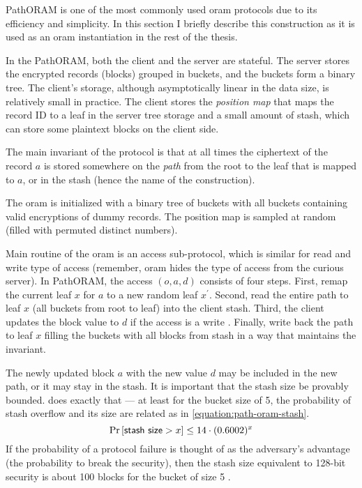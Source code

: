 			PathORAM \cite{path-oram} is one of the most commonly used \acrshort{oram} protocols due to its efficiency and simplicity.
			In this section I briefly describe this construction as it is used as an \acrshort{oram} instantiation in the rest of the thesis.

			In the PathORAM, both the client \client{} and the server \server{} are stateful.
			The server stores the encrypted records (blocks) grouped in buckets, and the buckets form a binary tree.
			The client's storage, although asymptotically linear in the data size, is relatively small in practice.
			The client stores the \emph{position map} that maps the record ID to a leaf in the server tree storage and a small amount of stash, which can store some plaintext blocks on the client side.

			The main invariant of the protocol is that at all times the ciphertext of the record $a$ is stored somewhere on the \emph{path} from the root to the leaf that is mapped to $a$, or in the stash (hence the name of the construction).

			The \acrshort{oram} is initialized with a binary tree of buckets with all buckets containing valid encryptions of dummy records.
			The position map is sampled at random (filled with permuted distinct numbers).

			Main routine of the \acrshort{oram} is an access sub-protocol, which is similar for read \oramRead{} and write \oramWrite{} type of access (remember, \acrshort{oram} hides the type of access from the curious server).
			In PathORAM, the access $(o, a, d)$ consists of four steps.
			First, remap the current leaf $x$ for $a$ to a new random leaf $x^\prime$.
			Second, read the entire path to leaf $x$ (all buckets from root to leaf) into the client stash.
			Third, the client updates the block value to $d$ if the access is a write \oramWrite{}.
			Finally, write back the path to leaf $x$ filling the buckets with all blocks from stash in a way that maintains the invariant.

			The newly updated block $a$ with the new value $d$ may be included in the new path, or it may stay in the stash.
			It is important that the stash size be provably bounded.
			\cite[Theorem 1]{path-oram} does exactly that --- at least for the bucket size of 5, the probability of stash overflow and its size are related as in \cref{equation:path-oram-stash}.
			\begin{equation}\label{equation:path-oram-stash}
				\probability{ \mathsf{stash\ size} > x } \leq 14 \cdot (0.6002) ^ x
			\end{equation}
			If the probability of a protocol failure is thought of as the adversary's advantage (the probability to break the security), then the stash size equivalent to 128-bit security is about 100 blocks for the bucket of size 5 \cite[Figure 5]{path-oram}.

